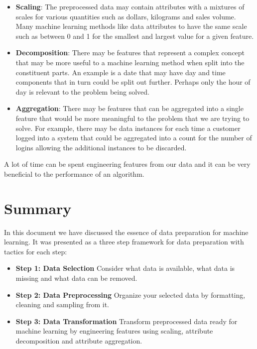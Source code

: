 \documentclass[11pt]{article}
\begin{document}
    \begin{itemize}
        \item \textbf{Scaling}: The preprocessed data may contain attributes with a mixtures of scales for various quantities such as dollars, kilograms and sales volume.
        Many machine learning methods like data attributes to have the same scale such as between 0 and 1 for the smallest and largest value for a given feature.

        \item \textbf{Decomposition}: There may be features that represent a complex concept that may be more useful to a machine learning method when split into the constituent parts.
        An example is a date that may have day and time components that in turn could be split out further.
        Perhaps only the hour of day is relevant to the problem being solved.

        \item \textbf{Aggregation}: There may be features that can be aggregated into a single feature that would be more meaningful to the problem that we are trying to solve.
        For example, there may be data instances for each time a customer logged into a system that could be aggregated into a count for the number of logins allowing the additional instances to be discarded.
    \end{itemize}

    A lot of time can be spent engineering features from our data and it can be very beneficial to the performance of an algorithm.

    \section{Summary} \label{sec:summary}

    In this document we have discussed the essence of data preparation for machine learning.
    It was presented as a three step framework for data preparation with tactics for each step:

    \begin{itemize}

        \item \textbf{Step 1: Data Selection} Consider what data is available, what data is missing and what data can be removed.

        \item \textbf{Step 2: Data Preprocessing} Organize your selected data by formatting, cleaning and sampling from it.

        \item \textbf{Step 3: Data Transformation} Transform preprocessed data ready for machine learning by engineering features using scaling, attribute decomposition and attribute aggregation.

    \end{itemize}
\end{document}
